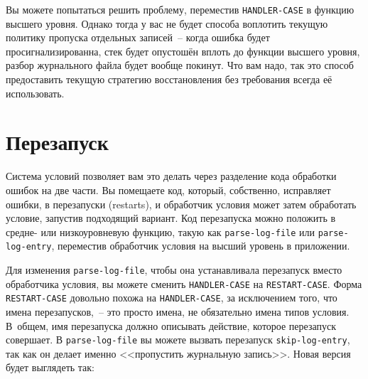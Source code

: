 
Вы можете попытаться решить проблему, переместив \lstinline{HANDLER-CASE} в функцию высшего
уровня. Однако тогда у вас не будет способа воплотить текущую политику пропуска отдельных
записей~-- когда ошибка будет просигнализированна, стек будет опустошён вплоть до функции
высшего уровня, разбор журнального файла будет вообще покинут. Что вам надо, так это
способ предоставить текущую стратегию восстановления без требования всегда её
использовать.



\section{Перезапуск}

Система условий позволяет вам это делать через разделение кода обработки ошибок на две
части. Вы помещаете код, который, собственно, исправляет ошибки, в перезапуски (restarts), и
обработчик условия может затем обработать условие, запустив подходящий вариант. Код
перезапуска можно положить в средне- или низкоуровневую функцию, такую как
\lstinline{parse-log-file} или \lstinline{parse-log-entry}, переместив обработчик условия на высший
уровень в приложении.

Для изменения \lstinline{parse-log-file}, чтобы она устанавливала перезапуск вместо обработчика
условия, вы можете сменить \lstinline{HANDLER-CASE} на \lstinline{RESTART-CASE}. Форма
\lstinline{RESTART-CASE} довольно похожа на \lstinline{HANDLER-CASE}, за исключением того, что имена
перезапусков,~-- это просто имена, не обязательно имена типов условия. В~общем, имя
перезапуска должно описывать действие, которое перезапуск совершает. В
\lstinline{parse-log-file} вы можете вызвать перезапуск \lstinline{skip-log-entry}, так как он делает
именно <<пропустить журнальную запись>>. Новая версия будет выглядеть так:

